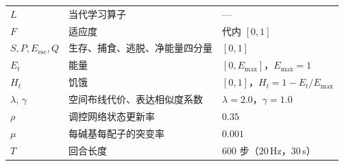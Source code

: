 \begin{table}[H]
{\begin{tabular}{@{}lll@{}}
  $L$ & 当代学习算子 & --- \\
  $F$ & 适应度 & 代内 $[0,1]$ \\
  $S,P,E_{\mathrm{esc}},Q$ & 生存、捕食、逃脱、净能量四分量 & $[0,1]$ \\
  $E_t$ & 能量 & $[0,E_{\max}]$，$E_{\max}=1$ \\
  $H_t$ & 饥饿 & $[0,1]$，$H_t=1-E_t/E_{\max}$ \\
  $\lambda,\,\gamma$ & 空间布线代价、表达相似度系数 & $\lambda=2.0$，$\gamma=1.0$ \\
  $\rho$ & 调控网络状态更新率 & $0.35$ \\
  $\mu$ & 每碱基每配子的突变率 & $0.001$ \\
  $T$ & 回合长度 & $600$ 步（$20$\,Hz，$30$\,s） \\
  \bottomrule
\end{tabular}}
\end{table}

